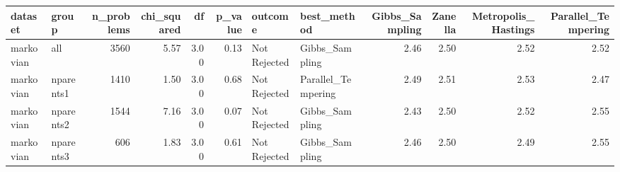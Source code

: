 \begin{table}[ht]
\centering
\begin{tabular}{llrrrrllrrrr}
  \hline
dataset & group & n\_problems & chi\_squared & df & p\_value & outcome & best\_method & Gibbs\_Sampling & Zanella & Metropolis\_Hastings & Parallel\_Tempering \\ 
  \hline
markovian & all & 3560 & 5.57 & 3.00 & 0.13 & Not Rejected & Gibbs\_Sampling & 2.46 & 2.50 & 2.52 & 2.52 \\ 
  markovian & nparents1 & 1410 & 1.50 & 3.00 & 0.68 & Not Rejected & Parallel\_Tempering & 2.49 & 2.51 & 2.53 & 2.47 \\ 
  markovian & nparents2 & 1544 & 7.16 & 3.00 & 0.07 & Not Rejected & Gibbs\_Sampling & 2.43 & 2.50 & 2.52 & 2.55 \\ 
  markovian & nparents3 & 606 & 1.83 & 3.00 & 0.61 & Not Rejected & Gibbs\_Sampling & 2.46 & 2.50 & 2.49 & 2.55 \\ 
   \hline
\end{tabular}
\end{table}
